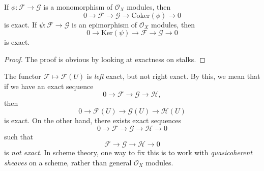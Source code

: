 \begin{lemma}
    If $\phi: \mathcal{F} \to \mathcal{G}$ is a monomorphism of $\mathcal{O}_X$ modules, then
    \[ 0 \to \mathcal{F} \to \mathcal{G} \to \text{Coker}(\phi) \to 0 \]
    is exact. If $\psi: \mathcal{F} \to \mathcal{G}$ is an epimorphism of $\mathcal{O}_X$ modules, then
    \[ 0 \to \text{Ker}(\psi) \to \mathcal{F} \to \mathcal{G} \to 0 \]
    is exact.
\end{lemma}
\begin{proof}
    The proof is obvious by looking at exactness on stalks.
\end{proof}

The functor $\mathcal{F} \mapsto \mathcal{F}(U)$ is \emph{left} exact, but not right exact. By this, we mean that if we have an exact sequence
%
\[ 0 \to \mathcal{F} \to \mathcal{G} \to \mathcal{H}, \]
%
then
%
\[ 0 \to \mathcal{F}(U) \to \mathcal{G}(U) \to \mathcal{H}(U) \]
%
is exact. On the other hand, there exists exact sequences
%
\[ 0 \to \mathcal{F} \to \mathcal{G} \to \mathcal{H} \to 0 \]
%
such that
%
\[ \mathcal{F} \to \mathcal{G} \to \mathcal{H} \to 0 \]
%
is \emph{not exact}. In scheme theory, one way to fix this is to work with \emph{quasicoherent sheaves} on a scheme, rather than general $\mathcal{O}_X$ modules.

